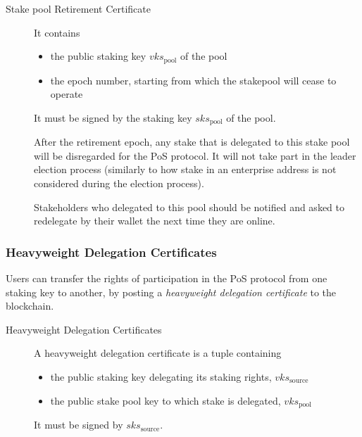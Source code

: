 \documentclass[11pt,a4paper]{article}
\begin{document}
\begin{description}
\item[Stake pool Retirement Certificate]
It contains

\begin{itemize}
\item
  the public staking key \(vks_\text{pool}\) of the pool
\item
  the epoch number, starting from which the stakepool will cease to
  operate
\end{itemize}

It must be signed by the staking key \(sks_\text{pool}\) of the pool.

After the retirement epoch, any stake that is delegated to this stake
pool will be disregarded for the PoS protocol. It will not take part in
the leader election process (similarly to how stake in an enterprise
address is not considered during the election process).

Stakeholders who delegated to this pool should be notified and asked to
redelegate by their wallet the next time they are online.
\end{description}

\subsubsection{Heavyweight Delegation
Certificates}\label{heavyweight-delegation-certificates}

Users can transfer the rights of participation in the PoS protocol from
one staking key to another, by posting a \emph{heavyweight delegation
certificate} to the blockchain.

\begin{description}
\item[Heavyweight Delegation Certificates]
A heavyweight delegation certificate is a tuple containing

\begin{itemize}
\item
  the public staking key delegating its staking rights,
  \(vks_\text{source}\)
\item
  the public stake pool key to which stake is delegated,
  \(vks_\text{pool}\)
\end{itemize}

It must be signed by \(sks_\text{source}\).
\end{description}
\end{document}
